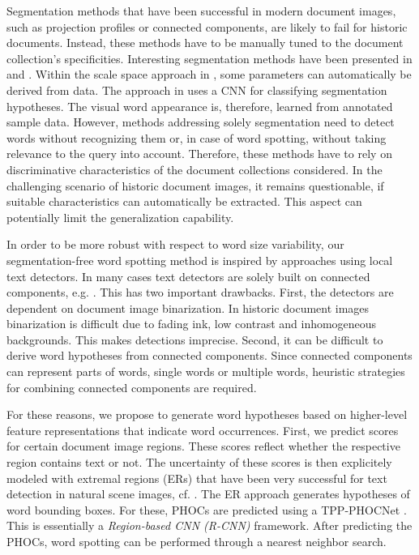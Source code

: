 Segmentation methods that have been successful in modern document images, such as projection
profiles or connected components, are likely to fail for historic documents. Instead, these methods have to be
manually tuned
to the document collection's specificities. Interesting segmentation methods have been
presented in \cite{Manmatha05} and \cite{Wilkinson15}. Within the scale space approach in
\cite{Manmatha05}, some parameters can
automatically be derived from data. The approach in \cite{Wilkinson15} uses a CNN for
classifying segmentation hypotheses. The visual word appearance is, therefore, learned from
annotated sample data. 
However, methods addressing solely segmentation need to detect words without recognizing them
or, in case of word spotting, without taking relevance to the query into account.   
Therefore, these methods have to rely on discriminative characteristics of the document
collections considered. In the challenging scenario of historic document images, it
remains questionable, if suitable characteristics can automatically be extracted.
This aspect can potentially limit the generalization capability.

In order to be more robust with respect to word size variability,
our segmentation-free word spotting method is inspired by approaches using local text
detectors. In many cases text detectors are solely built on connected components, 
e.g. \cite{Rodriguez09, Kovalchuk14, Ghosh15a}. %
This has two important drawbacks. First, the
detectors are dependent on document image binarization. In historic document images
binarization is difficult due to fading ink, low contrast and inhomogeneous backgrounds. This
makes detections imprecise. Second, it can be difficult to derive word hypotheses from
connected components. Since connected components can represent parts of words, single words or
multiple words, heuristic strategies for combining connected components are required.

For these reasons, we propose to generate word hypotheses based on higher-level feature
representations that indicate word occurrences. First, we predict scores for certain
document image regions. These scores reflect whether the respective region contains text or not. The uncertainty of these scores is then explicitely modeled with
extremal regions (ERs) \cite{Matas04} that have been very successful for text detection in
natural scene images, cf. \cite{Neumann16}. The ER approach generates hypotheses of word bounding boxes. 
For these, PHOCs are predicted using a TPP-PHOCNet \cite{Sudholt17}. This is essentially a \emph{Region-based CNN (R-CNN)} \cite{Girshick2016-RBC} framework.
After predicting the PHOCs, word spotting can be performed through a nearest neighbor search.

